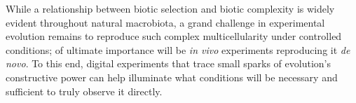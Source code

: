 While a relationship between biotic selection and biotic complexity is widely evident throughout natural macrobiota, a grand challenge in experimental evolution remains to reproduce such complex multicellularity under controlled conditions;
of ultimate importance will be \textit{in vivo} experiments reproducing it \textit{de novo}.
To this end, digital experiments that trace small sparks of evolution's constructive power \unskip\citep{dolson2019constructive} can help illuminate what conditions will be necessary and sufficient to truly observe it directly.




